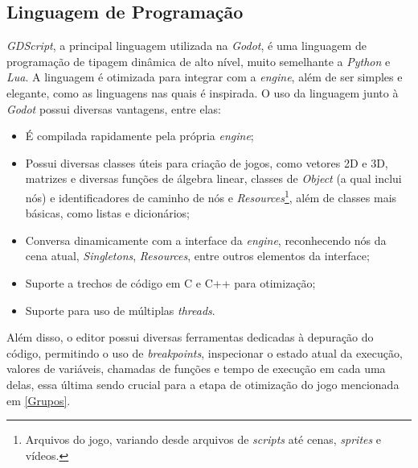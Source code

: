 \subsection{Linguagem de Programação}

\textit{GDScript}, a principal linguagem utilizada na \textit{Godot}, é uma linguagem de programação de tipagem dinâmica de alto nível, muito semelhante a \textit{Python} e \textit{Lua}. A linguagem é otimizada para integrar com a \textit{engine}, além de ser simples e elegante, como as linguagens nas quais é inspirada. O uso da linguagem junto à \textit{Godot} possui diversas vantagens, entre elas:

\begin{itemize}
    \item É compilada rapidamente pela própria \textit{engine};
    \item Possui diversas classes úteis para criação de jogos, como vetores 2D e 3D, matrizes e diversas funções de álgebra linear, classes de \textit{Object} (a qual inclui nós) e identificadores de caminho de nós e \textit{Resources}\footnote{
        Arquivos do jogo, variando desde arquivos de \textit{scripts} até cenas, \textit{sprites} e vídeos.
    }, além de classes mais básicas, como listas e dicionários;
    \item Conversa dinamicamente com a interface da \textit{engine}, reconhecendo nós da cena atual, \textit{Singletons}, \textit{Resources}, entre outros elementos da interface;
    \item Suporte a trechos de código em C e C++ para otimização;
    \item Suporte para uso de múltiplas \textit{threads}.
\end{itemize}

Além disso, o editor possui diversas ferramentas dedicadas à depuração do código, permitindo o uso de \textit{breakpoints}, inspecionar o estado atual da execução, valores de variáveis, chamadas de funções e tempo de execução em cada uma delas, essa última sendo crucial para a etapa de otimização do jogo mencionada em \ref{Grupos}.
